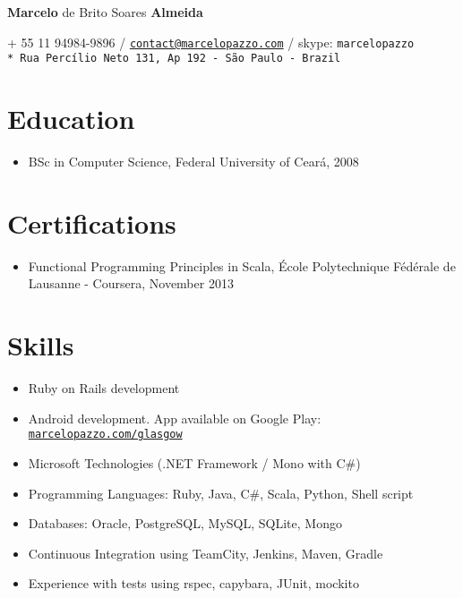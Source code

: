\documentclass[a4paper]{article}
\def\name{\textbf{Marcelo} de Brito Soares \textbf{Almeida}}
\begin{document}
\begin{flushright}

{\huge \name}

\vspace{0.05in}
+ 55 11 94984-9896 / \href{mailto:contact@marcelopazzo.com}{\tt contact@marcelopazzo.com} / skype: \tt marcelopazzo
\vspace{0.01in} \\* 
Rua Percílio Neto 131, Ap 192 - São Paulo - Brazil

\end{flushright}

\section*{Education}
\begin{itemize}
  \item BSc in Computer Science, Federal University of Ceará, 2008
\end{itemize}

\section*{Certifications}
\begin{itemize}
  \item Functional Programming Principles in Scala, École Polytechnique Fédérale de Lausanne - Coursera, November 2013
\end{itemize}

\section*{Skills}
\begin{itemize}
  \item Ruby on Rails development
  \item Android development. App available on Google Play: \href{http://marcelopazzo.com/glasgow/}{\tt marcelopazzo.com/glasgow}
  \item Microsoft Technologies (.NET Framework / Mono with C\#) 
  \item Programming Languages: Ruby, Java, C\#, Scala, Python, Shell script
  \item Databases: Oracle, PostgreSQL, MySQL, SQLite, Mongo
  \item Continuous Integration using TeamCity, Jenkins, Maven, Gradle
  \item Experience with tests using rspec, capybara, JUnit, mockito
\end{itemize}
\end{document}
